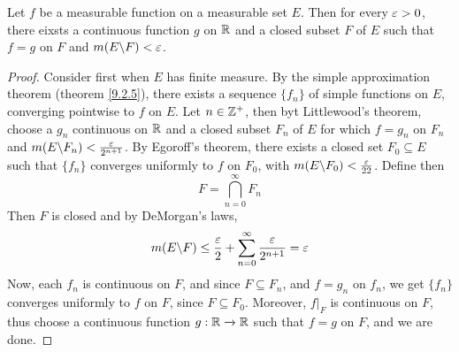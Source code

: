 \begin{theorem}\label{9.3.4}
    Let $f$ be a measurable function on a measurable set $E$. Then for every
    $\varepsilon>0$, there eixsts a continuous function  $g$ on  $\mathbb{R}$ and a closed subset
    $F$ of $E$ such that $f=g$ on  $F$ and  $m(E \backslash F)<\varepsilon$.
\end{theorem}
\begin{proof}
    Consider first when $E$ has finite measure. By the simple approximation
    theorem (theorem \ref{9.2.5}), there exists a sequence $\{f_n\}$ of simple
    functions on $E$, converging pointwise to  $f$ on  $E$. Let  $n \in \mathbb{Z}^+$,
    then byt Littlewood's theorem, choose a  $g_n$ continuous on  $\mathbb{R}$ and a
    closed subset $F_n$ of  $E$ for which  $f=g_n$ on  $F_n$ and
    $m(E \backslash F_n)<\frac{\varepsilon}{2^{n+1}}$. By Egoroff's theorem, there exists a
    closed set $F_0 \subseteq E$ such that $\{f_n\}$ converges uniformly to $f$
    on  $F_0$, with $m(E \backslash F_0)<\frac{\varepsilon}{22}$. Define then
    \begin{equation*}
        F=\bigcap_{n=0}^\infty{F_n}
    \end{equation*}
    Then $F$ is closed and by DeMorgan's laws,
    \begin{equation*}
        m(E \backslash F) \leq \frac{\varepsilon}{2}+\sum_{n=0}^\infty{\frac{\varepsilon}{2^{n+1}}}=\varepsilon
    \end{equation*}
    Now, each $f_n$ is continuous on  $F$, and since $F \subseteq F_n$, and
    $f=g_n$ on  $f_n$, we get  $\{f_n\}$ converges uniformly to $f$ on $F$,
    since $F \subseteq F_0$. Moreover, $f|_F$ is continuous on  $F$, thus choose
    a continuous function  $g:\mathbb{R} \xrightarrow{} \mathbb{R}$ such that $f=g$ on  $F$, and
    we are done.
\end{proof}
